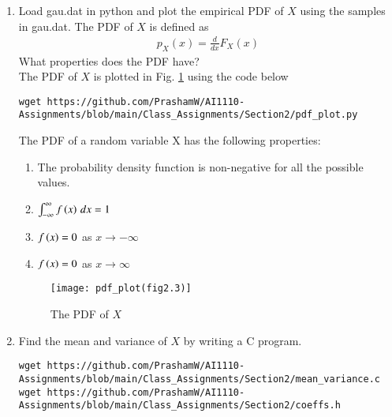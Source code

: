 \documentclass[journal,12pt,twocolumn]{IEEEtran}
\renewcommand\thesection{\arabic{section}}
\begin{document}
\begin{enumerate}[label=\thesection.\arabic*
,ref=\thesection.\theenumi]
\item
Load gau.dat in python and plot the empirical PDF of $X$ using the samples in gau.dat. The PDF of $X$ is defined as
\begin{align}
p_{X}(x) = \frac{d}{dx}F_{X}(x)
\end{align}
What properties does the PDF have?
\\
\solution The PDF of $X$ is plotted in Fig. \ref{fig:pdf_plot(fig2.3)} using the code below
\begin{lstlisting}
wget https://github.com/PrashamW/AI1110-Assignments/blob/main/Class_Assignments/Section2/pdf_plot.py
\end{lstlisting}
The PDF of a random variable X has the following properties:
\begin{enumerate}
    \item The probability density function is non-negative for all the possible values. \\
    \item $ \int_{-\infty}^{\infty} f\left(x\right) \,dx  = 1 $ 
    \item $f\left(x\right) = 0$ as $x \rightarrow -\infty$
    \item $f\left(x\right) = 0$ as $x \rightarrow \infty$
\end{enumerate}
\begin{figure}
\centering
\texttt{[image: pdf\_plot(fig2.3)]}
\caption{The PDF of $X$}
\label{fig:pdf_plot(fig2.3)}
\end{figure}
\item Find the mean and variance of $X$ by writing a C program.\\
\solution
\begin{lstlisting}
wget https://github.com/PrashamW/AI1110-Assignments/blob/main/Class_Assignments/Section2/mean_variance.c
wget https://github.com/PrashamW/AI1110-Assignments/blob/main/Class_Assignments/Section2/coeffs.h
\end{lstlisting}


\end{enumerate}
\end{document}
